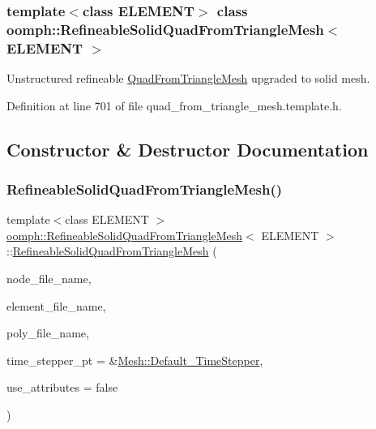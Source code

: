 \subsubsection*{template$<$class E\+L\+E\+M\+E\+NT$>$\newline
class oomph\+::\+Refineable\+Solid\+Quad\+From\+Triangle\+Mesh$<$ E\+L\+E\+M\+E\+N\+T $>$}

Unstructured refineable \hyperlink{classoomph_1_1QuadFromTriangleMesh}{Quad\+From\+Triangle\+Mesh} upgraded to solid mesh. 

Definition at line 701 of file quad\+\_\+from\+\_\+triangle\+\_\+mesh.\+template.\+h.



\subsection{Constructor \& Destructor Documentation}
\mbox{\label{classoomph_1_1RefineableSolidQuadFromTriangleMesh_add069deb878fe3142334acac0c2d86af}} 
\subsubsection{\texorpdfstring{Refineable\+Solid\+Quad\+From\+Triangle\+Mesh()}{RefineableSolidQuadFromTriangleMesh()}\hspace{0.1cm}{\footnotesize\ttfamily [1/2]}}
{\footnotesize\ttfamily template$<$class E\+L\+E\+M\+E\+NT $>$ \\
\hyperlink{classoomph_1_1RefineableSolidQuadFromTriangleMesh}{oomph\+::\+Refineable\+Solid\+Quad\+From\+Triangle\+Mesh}$<$ E\+L\+E\+M\+E\+NT $>$\+::\hyperlink{classoomph_1_1RefineableSolidQuadFromTriangleMesh}{Refineable\+Solid\+Quad\+From\+Triangle\+Mesh} (\begin{DoxyParamCaption}\item[{const std\+::string \&}]{node\+\_\+file\+\_\+name,  }\item[{const std\+::string \&}]{element\+\_\+file\+\_\+name,  }\item[{const std\+::string \&}]{poly\+\_\+file\+\_\+name,  }\item[{\hyperlink{classoomph_1_1TimeStepper}{Time\+Stepper} $\ast$}]{time\+\_\+stepper\+\_\+pt = {\ttfamily \&\hyperlink{classoomph_1_1Mesh_a12243d0fee2b1fcee729ee5a4777ea10}{Mesh\+::\+Default\+\_\+\+Time\+Stepper}},  }\item[{const bool \&}]{use\+\_\+attributes = {\ttfamily false} }\end{DoxyParamCaption})\hspace{0.3cm}{\ttfamily [inline]}}



